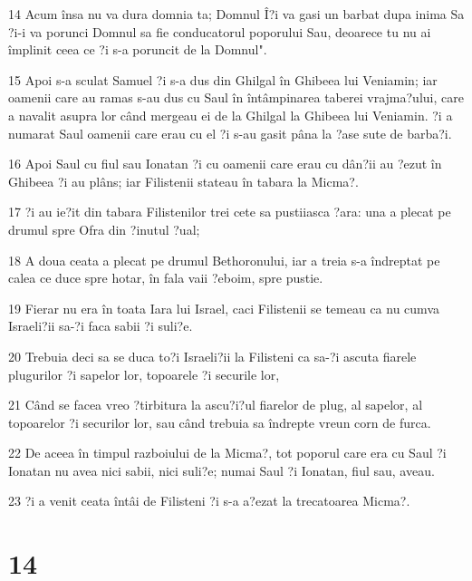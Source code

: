 \par 14 Acum însa nu va dura domnia ta; Domnul Î?i va gasi un barbat dupa inima Sa ?i-i va porunci Domnul sa fie conducatorul poporului Sau, deoarece tu nu ai împlinit ceea ce ?i s-a poruncit de la Domnul".
\par 15 Apoi s-a sculat Samuel ?i s-a dus din Ghilgal în Ghibeea lui Veniamin; iar oamenii care au ramas s-au dus cu Saul în întâmpinarea taberei vrajma?ului, care a navalit asupra lor când mergeau ei de la Ghilgal la Ghibeea lui Veniamin. ?i a numarat Saul oamenii care erau cu el ?i s-au gasit pâna la ?ase sute de barba?i.
\par 16 Apoi Saul cu fiul sau Ionatan ?i cu oamenii care erau cu dân?ii au ?ezut în Ghibeea ?i au plâns; iar Filistenii stateau în tabara la Micma?.
\par 17 ?i au ie?it din tabara Filistenilor trei cete sa pustiiasca ?ara: una a plecat pe drumul spre Ofra din ?inutul ?ual;
\par 18 A doua ceata a plecat pe drumul Bethoronului, iar a treia s-a îndreptat pe calea ce duce spre hotar, în fala vaii ?eboim, spre pustie.
\par 19 Fierar nu era în toata Iara lui Israel, caci Filistenii se temeau ca nu cumva Israeli?ii sa-?i faca sabii ?i suli?e.
\par 20 Trebuia deci sa se duca to?i Israeli?ii la Filisteni ca sa-?i ascuta fiarele plugurilor ?i sapelor lor, topoarele ?i securile lor,
\par 21 Când se facea vreo ?tirbitura la ascu?i?ul fiarelor de plug, al sapelor, al topoarelor ?i securilor lor, sau când trebuia sa îndrepte vreun corn de furca.
\par 22 De aceea în timpul razboiului de la Micma?, tot poporul care era cu Saul ?i Ionatan nu avea nici sabii, nici suli?e; numai Saul ?i Ionatan, fiul sau, aveau.
\par 23 ?i a venit ceata întâi de Filisteni ?i s-a a?ezat la trecatoarea Micma?.

\chapter{14}

